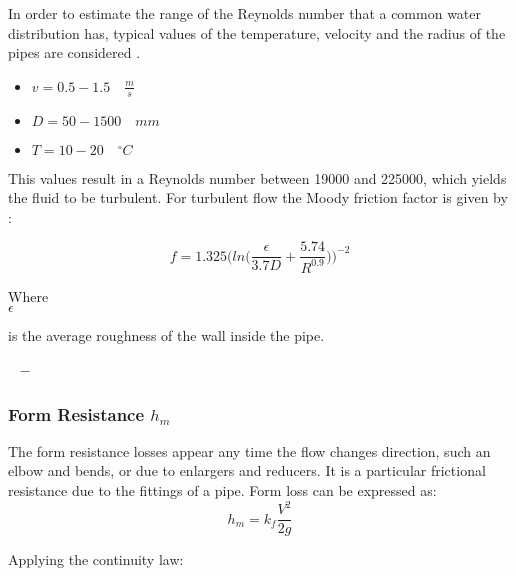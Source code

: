 In order to estimate the range of the Reynolds number that a common water 
distribution has, typical values of the temperature, velocity and the radius of 
the pipes are considered \cite{Urban_Design}. 

\begin{itemize}
  \item $v = 0.5 - 1.5  \quad \frac{m}{s}$
  \item $D = 50 - 1500\quad mm$
  \item $T = 10 - 20 \quad ^{\circ} C$
\end{itemize}

This values result in a Reynolds number between 19000 and 225000, which yields the fluid to be turbulent. For turbulent flow the 
Moody friction factor is given by \cite{Design_Water} : 

\begin{equation}
  f = 1.325 \bigg(ln\bigg(\frac{\epsilon}{3.7 D}+\frac{5.74}{R^{0.9}}\bigg)\bigg)^{-2}
  \label{turbulent}
\end{equation}

\begin{minipage}[t]{0.20\textwidth}
Where\\
\hspace*{8mm} $\epsilon$ 
\end{minipage}
\begin{minipage}[t]{0.68\textwidth}
\vspace*{2mm}
is the average roughness of the wall inside the pipe.
 \end{minipage}
\begin{minipage}[t]{0.10\textwidth}
\vspace*{2mm}
\textcolor{White}{te}$\unit{-}$
\end{minipage}

%
\subsubsection{Form Resistance \texorpdfstring{$h_m$}{}} 

The form resistance losses appear any time the flow changes direction, such an elbow and bends,
or due to enlargers and reducers. It is a particular frictional resistance due to the 
fittings of a pipe. Form loss can be expressed as:
\begin{equation}
  h_m = k_f \frac{V^2}{2g}
\end{equation}


Applying the continuity law:

